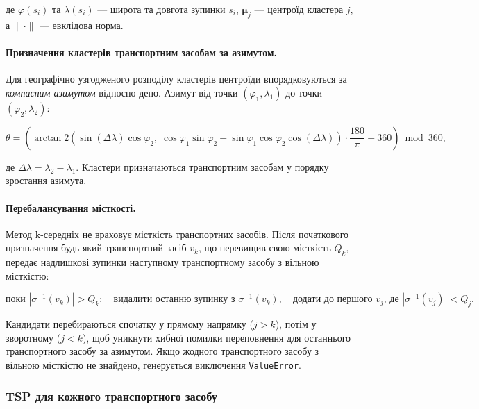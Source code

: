 \documentclass[12pt, a4paper]{article}
\theoremstyle{definition}
\begin{document}
\noindent де $\varphi(s_i)$ та $\lambda(s_i)$ --- широта та довгота зупинки
$s_i$, $\boldsymbol{\mu}_j$ --- центроїд кластера $j$, а $\|\cdot\|$ ---
евклідова норма.

\paragraph{Призначення кластерів транспортним засобам за азимутом.}
Для географічно узгодженого розподілу кластерів центроїди впорядковуються
за \emph{компасним азимутом} відносно депо. Азимут від точки
$(\varphi_1, \lambda_1)$ до точки $(\varphi_2, \lambda_2)$:

\begin{equation}
  \label{eq:bearing}
  \theta = \left(
    \arctan2\!\left(
      \sin(\Delta\lambda)\cos\varphi_2,\;
      \cos\varphi_1 \sin\varphi_2 - \sin\varphi_1 \cos\varphi_2 \cos(\Delta\lambda)
    \right) \cdot \frac{180}{\pi} + 360
  \right) \bmod 360,
\end{equation}

\noindent де $\Delta\lambda = \lambda_2 - \lambda_1$. Кластери призначаються
транспортним засобам у порядку зростання азимута.

\paragraph{Перебалансування місткості.}
Метод k-середніх не враховує місткість транспортних засобів. Після початкового
призначення будь-який транспортний засіб $v_k$, що перевищив свою місткість
$Q_k$, передає надлишкові зупинки наступному транспортному засобу з вільною
місткістю:

\begin{equation}
  \label{eq:rebalance}
  \text{поки } |\sigma^{-1}(v_k)| > Q_k :
  \quad\text{видалити останню зупинку з } \sigma^{-1}(v_k),
  \quad\text{додати до першого } v_j \text{, де } |\sigma^{-1}(v_j)| < Q_j.
\end{equation}

Кандидати перебираються спочатку у прямому напрямку ($j > k$), потім у
зворотному ($j < k$), щоб уникнути хибної помилки переповнення для останнього
транспортного засобу за азимутом. Якщо жодного транспортного засобу з
вільною місткістю не знайдено, генерується виключення \texttt{ValueError}.

\subsubsection{TSP для кожного транспортного засобу}
\end{document}
